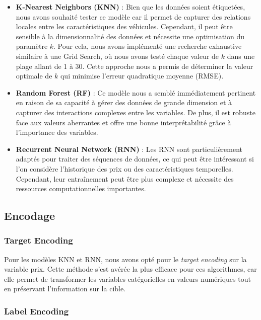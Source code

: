 \documentclass[12pt]{report}
\begin{document}
\begin{itemize}
    \item \textbf{K-Nearest Neighbors (KNN)} : Bien que les données soient étiquetées, nous avons souhaité tester ce modèle car il permet de capturer des relations locales entre les caractéristiques des véhicules. Cependant, il peut être sensible à la dimensionnalité des données et nécessite une optimisation du paramètre \( k \). Pour cela, nous avons implémenté une recherche exhaustive similaire à une Grid Search, où nous avons testé chaque valeur de \( k \) dans une plage allant de 1 à 30. Cette approche nous a permis de déterminer la valeur optimale de \( k \) qui minimise l'erreur quadratique moyenne (RMSE).

    \item \textbf{Random Forest (RF)} : Ce modèle nous a semblé immédiatement pertinent en raison de sa capacité à gérer des données de grande dimension et à capturer des interactions complexes entre les variables. De plus, il est robuste face aux valeurs aberrantes et offre une bonne interprétabilité grâce à l'importance des variables.

    \item \textbf{Recurrent Neural Network (RNN)} : Les RNN sont particulièrement adaptés pour traiter des séquences de données, ce qui peut être intéressant si l'on considère l'historique des prix ou des caractéristiques temporelles. Cependant, leur entraînement peut être plus complexe et nécessite des ressources computationnelles importantes.
\end{itemize}



\subsection{Encodage}

\subsubsection{Target Encoding}

Pour les modèles KNN et RNN, nous avons opté pour le \textit{target encoding} sur la variable prix. Cette méthode s'est avérée la plus efficace pour ces algorithmes, car elle permet de transformer les variables catégorielles en valeurs numériques tout en préservant l'information sur la cible.

\subsubsection{Label Encoding}
\end{document}
